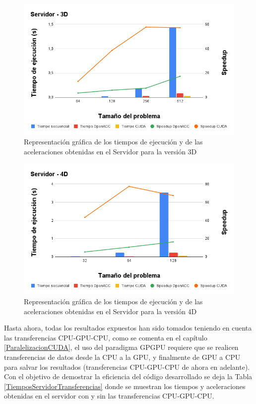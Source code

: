 \begin{figure}[H]
    \centering
    \includegraphics[width=\textwidth]{img/Servidor - 3D.png}
    \caption{Representación gráfica de los tiempos de ejecución y de las aceleraciones obtenidas en el Servidor para la versión 3D }
    \label{GraficoServidor3D}
\end{figure}

\begin{figure}[H]
    \centering
    \includegraphics[width=\textwidth]{img/Servidor - 4D.png}
    \caption{Representación gráfica de los tiempos de ejecución y de las aceleraciones obtenidas en el Servidor para la versión 4D }
    \label{GraficoServidor4D}
\end{figure}
\raggedbottom
Hasta ahora, todas los resultados expuestos han sido tomados teniendo en cuenta las transferencias CPU-GPU-CPU, como se comenta en el capítulo \ref{ParalelizacionCUDA}, el uso del paradigma GPGPU requiere que se realicen transferencias de datos desde la CPU a la GPU, y finalmente de GPU a CPU para salvar los resultados (transferencias CPU-GPU-CPU de ahora en adelante). Con el objetivo de demostrar la eficiencia del código desarrollado se deja la Tabla \ref{TiemposServidorTransferencias} donde se muestran los tiempos y aceleraciones obtenidas en el servidor con y sin las transferencias CPU-GPU-CPU.

